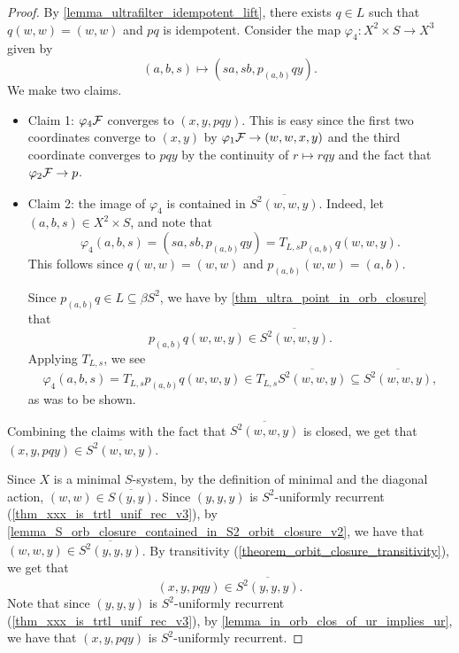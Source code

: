 \begin{proof}
    By \cref{lemma_ultrafilter_idempotent_lift}, there exists $q \in L$ such that $q (w,w) = (w,w)$ and $pq$ is idempotent. Consider the map $\varphi_4: X^2 \times S \to X^3$ given by
    \[(a,b,s) \mapsto (sa,sb,p_{(a,b)}qy).\]
    We make two claims.
    \begin{itemize}
        \item Claim 1: $\varphi_4 \mathcal{F}$ converges to $(x,y,pqy)$.  This is easy since the first two coordinates converge to $(x,y)$ by $\varphi_1 \mathcal{F} \to (w,w,x,y)$ and the third coordinate converges to $pqy$ by the continuity of $r \mapsto rqy$ and the fact that $\varphi_2 \mathcal{F} \to p$.
        
        \item Claim 2: the image of $\varphi_4$ is contained in $\overline{S^2 (w,w,y)}$.  Indeed, let $(a,b,s) \in X^2 \times S$, and note that
        \[\varphi_4 (a,b,s) = (sa,sb,p_{(a,b)} q y) = T_{L,s} p_{(a,b)} q (w,w,y).\]
        This follows since $q(w,w) = (w,w)$ and $p_{(a,b)}(w,w) = (a,b)$.
        
        Since $p_{(a,b)}q \in L \subseteq \beta S^2$, we have by \cref{thm_ultra_point_in_orb_closure} that
    \[p_{(a,b)} q (w,w,y) \in \overline{S^2 (w,w,y)}.\]
    Applying $T_{L,s}$, we see
    \[\varphi_4 (a,b,s) = T_{L,s} p_{(a,b)} q (w,w,y) \in T_{L,s} \overline{S^2 (w,w,y)} \subseteq \overline{S^2 (w,w,y)},\]
    as was to be shown.
    \end{itemize}
    Combining the claims with the fact that $\overline{S^2 (w,w,y)}$ is closed, we get that $(x,y,pqy) \in \overline{S^2 (w,w,y)}$.
    
    Since $X$ is a minimal $S$-system, by the definition of minimal and the diagonal action, $(w,w) \in \overline{S(y,y)}$.  Since $(y,y,y)$ is $S^2$-uniformly recurrent (\cref{thm_xxx_is_trtl_unif_rec_v3}), by \cref{lemma_S_orb_closure_contained_in_S2_orbit_closure_v2}, we have that $(w,w,y) \in \overline{S^2(y,y,y)}$. By transitivity (\cref{theorem_orbit_closure_transitivity}), we get that
    \[(x, y, pq y) \in \overline{S^2(y,y,y)}.\]
    Note that since $(y,y,y)$ is $S^2$-uniformly recurrent (\cref{thm_xxx_is_trtl_unif_rec_v3}), by \cref{lemma_in_orb_clos_of_ur_implies_ur}, we have that $(x,y, pq y)$ is $S^2$-uniformly recurrent.
    

\end{proof}
